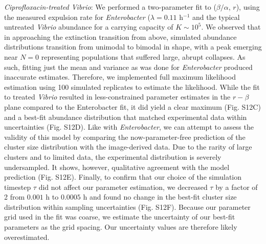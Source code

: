 \textit{Ciprofloxacin-treated Vibrio}: We performed a two-parameter fit to ($\beta/\alpha$, $r$), using the measured expulsion rate for \textit{Enterobacter} ($\lambda = 0.11$ h$^{-1}$ and the typical untreated \textit{Vibrio} abundance for a carrying capacity of $K \sim 10^5$. We observed that in approaching the extinction transition from above, simulated abundance distributions transition from unimodal to bimodal in shape, with a peak emerging near $N=0$ representing populations that suffered large, abrupt collapses. As such, fitting just the mean and variance as was done for \textit{Enterobacter} produced inaccurate estimates. Therefore, we implemented full maximum likelihood estimation using 100 simulated replicates to estimate the likelihood. While the fit to treated \textit{Vibrio} resulted in less-constrained parameter estimates in the $r-\beta$ plane compared to the Enterobacter fit, it did yield a clear maximum (Fig. S12C) and a best-fit abundance distribution that matched experimental data within uncertainties (Fig. S12D). Like with \textit{Enterobacter}, we can attempt to assess the validity of this model by comparing the now-parameter-free prediction of the cluster size distribution with the image-derived data. Due to the rarity of large clusters and to limited data, the experimental distribution is severely undersampled. It shows, however, qualitative agreement with the model prediction (Fig. S12E). Finally, to confirm that our choice of the simulation timestep $\tau$ did not affect our parameter estimation, we decreased $\tau$ by a factor of 2 from $0.001$ h to $0.0005$ h and found no change in the best-fit cluster size distribution within sampling uncertainties (Fig. S12F). Because our parameter grid used in the fit was coarse, we estimate the uncertainty of our best-fit parameters as the grid spacing. Our uncertainty values are therefore likely overestimated.


